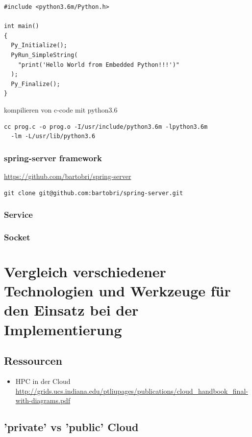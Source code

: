 \documentclass[a4paper,10pt]{article}
\begin{document}
\begin{lstlisting}
#include <python3.6m/Python.h>

int main()
{
  Py_Initialize();
  PyRun_SimpleString(
    "print('Hello World from Embedded Python!!!')"
  );
  Py_Finalize();
}
\end{lstlisting}

kompilieren von c-code mit python3.6

\begin{lstlisting}
cc prog.c -o prog.o -I/usr/include/python3.6m -lpython3.6m 
  -lm -L/usr/lib/python3.6
\end{lstlisting}

\subsubsection{spring-server framework}

\url{https://github.com/bartobri/spring-server}

\begin{lstlisting}
git clone git@github.com:bartobri/spring-server.git
\end{lstlisting}

\subsubsection{Service}
\subsubsection{Socket}

\newpage

\section{Vergleich verschiedener Technologien und Werkzeuge für den Einsatz bei der Implementierung}

\subsection{Ressourcen}

\begin{itemize}
 \item HPC in der Cloud \url{http://grids.ucs.indiana.edu/ptliupages/publications/cloud_handbook_final-with-diagrams.pdf}
\end{itemize}


\subsection{'private' vs 'public' Cloud}
\end{document}
